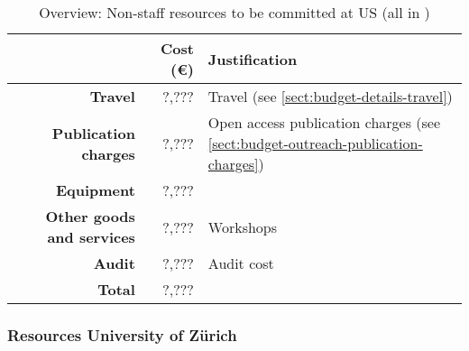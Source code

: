 \bigskip
\begin{table}[H]
\begin{tabular}{|r|r|p{9cm}|}
\hline
\textbf{} & \textbf{Cost (\euro)} & \textbf{Justification} \\\hline
\textbf{Travel} & ?,??? & Travel (see \ref{sect:budget-details-travel})\\\hline
\textbf{Publication charges} & ?,??? & Open access publication charges (see \ref{sect:budget-outreach-publication-charges})\\\hline
\textbf{Equipment} & ?,??? &  \\\hline    %

\textbf{Other goods and services} & ?,??? & Workshops \\\hline   %
\textbf{Audit} & ?,??? & Audit cost \\\hline
\textbf{Total} & ?,???\\\cline{1-2}
\end{tabular}
\caption{Overview: Non-staff resources to be committed at US (all in \texteuro)}\vspace*{-1em}
\end{table}




\subsubsection{Resources University of Z\"{u}rich}



